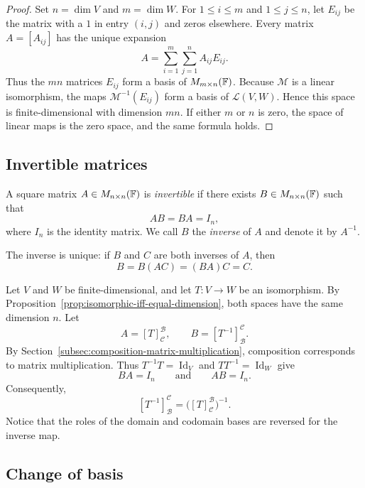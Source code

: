\begin{proof}
  Set $n=\dim V$ and $m=\dim W$. For $1\leq i\leq m$ and
  $1\leq j\leq n$, let $E_{ij}$ be the matrix with a $1$ in entry
  $(i,j)$ and zeros elsewhere. Every matrix $A=[A_{ij}]$ has the
  unique expansion
  \[
    A=\sum_{i=1}^m\sum_{j=1}^n A_{ij}E_{ij}.
  \]
  Thus the $mn$ matrices $E_{ij}$ form a basis of
  $M_{m\times n}(\mathbb{F})$. Because $\mathcal M$ is a linear
  isomorphism, the maps $\mathcal M^{-1}(E_{ij})$ form a basis of
  $\mathcal L(V,W)$. Hence this space is finite-dimensional with
  dimension $mn$. If either $m$ or $n$ is zero, the space of linear
  maps is the zero space, and the same formula holds.
\end{proof}

\subsection{Invertible matrices}

\begin{definition}
  A square matrix $A\in M_{n\times n}(\mathbb{F})$ is \emph{invertible}
  if there exists $B\in M_{n\times n}(\mathbb{F})$ such that
  \[
    AB=BA=I_n,
  \]
  where $I_n$ is the identity matrix. We call $B$ the \emph{inverse}
  of $A$ and denote it by $A^{-1}$.
\end{definition}

The inverse is unique: if $B$ and $C$ are both inverses of $A$, then
\[
  B=B(AC)=(BA)C=C.
\]

Let $V$ and $W$ be finite-dimensional, and let $T\colon V\to W$
be an isomorphism. By
Proposition~\ref{prop:isomorphic-iff-equal-dimension}, both spaces
have the same dimension $n$. Let
\[
  A=[T]_{\mathcal C}^{\mathcal B},
  \qquad
  B=[T^{-1}]_{\mathcal B}^{\mathcal C}.
\]
By Section~\ref{subsec:composition-matrix-multiplication}, composition
corresponds to matrix multiplication. Thus
$T^{-1}T=\operatorname{Id}_V$ and
$TT^{-1}=\operatorname{Id}_W$ give
\[
  BA=I_n
  \qquad\text{and}\qquad
  AB=I_n.
\]
Consequently,
\[
  [T^{-1}]_{\mathcal B}^{\mathcal C}
    =\bigl([T]_{\mathcal C}^{\mathcal B}\bigr)^{-1}.
\]
Notice that the roles of the domain and codomain bases are reversed
for the inverse map.

\subsection{Change of basis}

